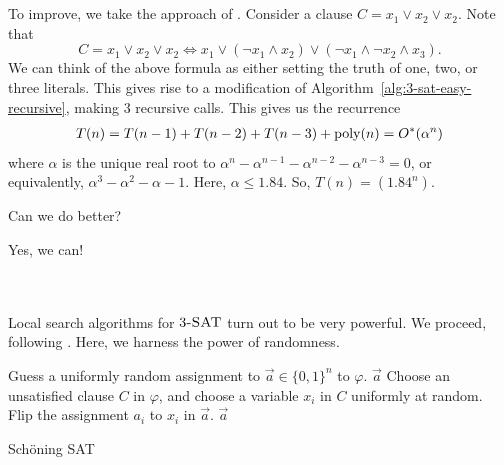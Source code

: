         \vphantom
        \\
        \\
        To improve, we take the approach of \cite{monien1985satisfiability}. Consider a clause \(C=x_1\vee x_2\vee x_2\). Note that
        \begin{equation*}
            C=x_1\vee x_2\vee x_2\iff x_1\vee(\neg x_1\wedge x_2)\vee(\neg x_1\wedge \neg x_2\wedge x_3).
        \end{equation*}
        We can think of the above formula as either setting the truth of one, two, or three literals. This gives rise to a modification of Algorithm~\ref{alg:3-sat-easy-recursive}, making \(3\) recursive calls. This gives us the recurrence
        \begin{align*}
            T(n)=T(n-1)+T(n-2)+T(n-3)+\operatorname{poly}(n)=O^*(\alpha^n)
        \end{align*}
        where \(\alpha\) is the unique real root to \(\alpha^n-\alpha^{n-1}-\alpha^{n-2}-\alpha^{n-3}=0\), or equivalently, \(\alpha^3-\alpha^2-\alpha-1\). Here, \(\alpha\leq 1.84\). So, \(T(n)=(1.84^n)\).
        \begin{question*}
            Can we do better?
        \end{question*}
        \begin{answer*}
            Yes, we can!
        \end{answer*}
        \vphantom
        \\
        \\
        Local search algorithms for \(3\textsc{-SAT}\) turn out to be very powerful. We proceed, following \cite{schoning1999probabilisticksat,spielman2007satlecture}. Here, we harness the power of randomness.
        \begin{algorithm}[H] 
            \begin{algorithmic}[1]
                    \State Guess a uniformly random assignment to \(\vec{a}\in\{0,1\}^n\) to \(\varphi\).
                         \Return \(\vec{a}\)
                        \Else
                            \State Choose an unsatisfied clause \(C\) in \(\varphi\), and choose a variable \(x_i\) in \(C\) uniformly at random.
                            \State Flip the assignment \(a_i\) to \(x_i\) in \(\vec{a}\).
                        \EndIf
                    \EndFor
                    \State \Return \(\vec{a}\)
                \EndProcedure 
            \end{algorithmic}
            \caption{Sch\"oning SAT}
            \label{alg:schoningsat}
        \end{algorithm}
